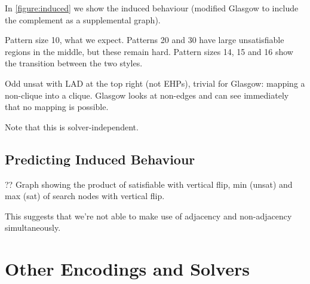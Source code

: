\documentclass[letterpaper]{article}
\begin{document}
In \cref{figure:induced} we show the induced behaviour (modified Glasgow to include the complement
as a supplemental graph).

Pattern size 10, what we expect. Patterns 20 and 30 have large unsatisfiable regions in the middle,
but these remain hard. Pattern sizes 14, 15 and 16 show the transition between the two styles.

Odd unsat with LAD at the top right (not EHPs), trivial for Glasgow: mapping a non-clique into a
clique. Glasgow looks at non-edges and can see immediately that no mapping is possible.

Note that this is solver-independent.

\lipsum[7]

\lipsum[8]

\begin{figure*}[t]
    
    \caption{Behaviour of algorithms on the induced variant, shown in the style
    of \cref{figure:non-induced}. The second row shows a bound on the satisfiable region, by
    considering where a \emph{non-}induced isomorphism may also be a non-induced isomorphism between
    complement graphs.}\label{figure:induced}
\end{figure*}

\subsection{Predicting Induced Behaviour}

?? Graph showing the product of satisfiable with vertical flip, min (unsat) and max (sat) of search
nodes with vertical flip.

This suggests that we're not able to make use of adjacency and non-adjacency simultaneously.

\lipsum[9]

\lipsum[10]

\section{Other Encodings and Solvers}

\begin{figure*}[t]
    
    \caption{Behaviour of other solvers on the induced variant on smaller graphs, shown in the style of
        \cref{figure:non-induced}. The second row shows the number of search nodes used by the Glasgow
        algorithm, the third row shows the number of decisions made by the Clasp pseudo-boolean solver,
        the fourth row shows the number of search nodes used by a clique encoding, and the fifth a mixed
        integer encoding with Gurobi.}\label{figure:alt}
\end{figure*}
\end{document}
